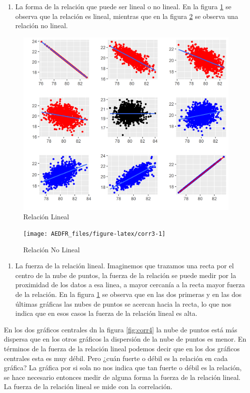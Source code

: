 \documentclass[letterpaper,]{book}
\providecommand{\tightlist}{%
  \setlength{\itemsep}{0pt}\setlength{\parskip}{0pt}}
\begin{document}
\begin{enumerate}
\def\labelenumi{\arabic{enumi}.}
\setcounter{enumi}{1}
\tightlist
\item
  La forma de la relación que puede ser lineal o no lineal. En la figura \ref{fig:corr2} se observa que la relación es lineal, mientras que en la figura \ref{fig:corr3} se observa una relación no lineal.
\end{enumerate}

\begin{figure}[h]

{\centering \includegraphics[width=0.5\linewidth]{corr2} 

}

\caption{Relación Lineal}\label{fig:corr2}
\end{figure}

\begin{figure}[h]

{\centering \texttt{[image: AEDFR\_files/figure-latex/corr3-1]} 

}

\caption{Relación No Lineal}\label{fig:corr3}
\end{figure}

\begin{enumerate}
\def\labelenumi{\arabic{enumi}.}
\setcounter{enumi}{2}
\tightlist
\item
  La fuerza de la relación lineal. Imaginemos que trazamos una recta por el centro de la nube de puntos, la fuerza de la relación se puede medir por la proximidad de los datos a esa linea, a mayor cercanía a la recta mayor fuerza de la relación. En la figura \ref{fig:corr2} se observa que en las dos primeras y en las dos últimas gráficas las nubes de puntos se acercan hacia la recta, lo que nos indica que en esos casos la fuerza de la relación lineal es alta.
\end{enumerate}

En los dos gráficos centrales dn la figura \ref{fig:corr4} la nube de puntos está más dispersa que en los otros gráficos la dispersión de la nube de puntos es menor. En términos de la fuerza de la relación lineal podemos decir que en los dos gráficos centrales esta es muy débil. Pero ¿cuán fuerte o débil es la relación en cada gráfica? La gráfica por si sola no nos indica que tan fuerte o débil es la relación, se hace necesario entonces medir de alguna forma la fuerza de la relación lineal. La fuerza de la relación lineal se mide con la correlación.
\end{document}

